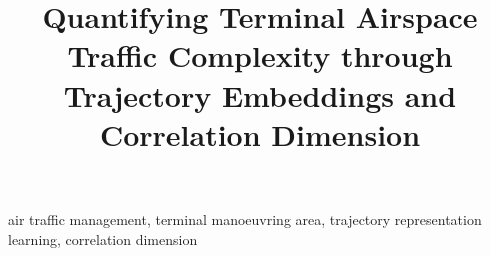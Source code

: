 \documentclass[conference]{IEEEtran}
\begin{document}
\title{Quantifying Terminal Airspace Traffic Complexity through
Trajectory Embeddings and Correlation Dimension}

\author{
}
\maketitle


\begin{IEEEkeywords}
air traffic management, terminal manoeuvring area, trajectory
representation learning, correlation dimension
\end{IEEEkeywords}









\appendices




\end{document}
